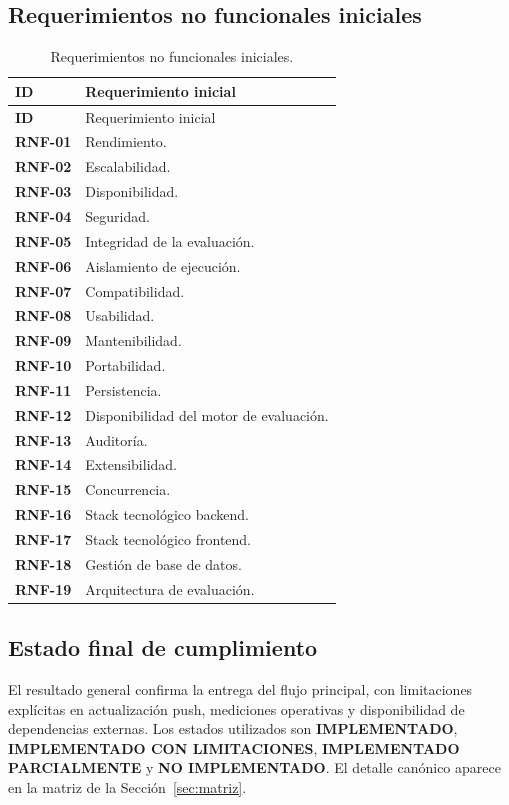 \documentclass[11pt,a4paper]{article}
\newcommand{\statusimpl}{\textbf{IMPLEMENTADO}\xspace}
\newcommand{\statuslim}{\textbf{IMPLEMENTADO CON LIMITACIONES}\xspace}
\newcommand{\statuspartial}{\textbf{IMPLEMENTADO PARCIALMENTE}\xspace}
\newcommand{\statusno}{\textbf{NO IMPLEMENTADO}\xspace}
\begin{document}
\subsection{Requerimientos no funcionales iniciales}
\begin{longtable}{>{\bfseries}p{1.6cm}p{12.6cm}}
\caption{Requerimientos no funcionales iniciales.}\label{tab:rnf-iniciales}\\
\toprule
ID & Requerimiento inicial \\
\midrule
\endfirsthead
\toprule
ID & Requerimiento inicial \\
\midrule
\endhead
RNF-01 & Rendimiento. \\
RNF-02 & Escalabilidad. \\
RNF-03 & Disponibilidad. \\
RNF-04 & Seguridad. \\
RNF-05 & Integridad de la evaluación. \\
RNF-06 & Aislamiento de ejecución. \\
RNF-07 & Compatibilidad. \\
RNF-08 & Usabilidad. \\
RNF-09 & Mantenibilidad. \\
RNF-10 & Portabilidad. \\
RNF-11 & Persistencia. \\
RNF-12 & Disponibilidad del motor de evaluación. \\
RNF-13 & Auditoría. \\
RNF-14 & Extensibilidad. \\
RNF-15 & Concurrencia. \\
RNF-16 & Stack tecnológico backend. \\
RNF-17 & Stack tecnológico frontend. \\
RNF-18 & Gestión de base de datos. \\
RNF-19 & Arquitectura de evaluación. \\
\bottomrule
\end{longtable}

\subsection{Estado final de cumplimiento}
El resultado general confirma la entrega del flujo principal, con limitaciones explícitas en actualización push, mediciones operativas y disponibilidad de dependencias externas. Los estados utilizados son \statusimpl, \statuslim, \statuspartial y \statusno. El detalle canónico aparece en la matriz de la Sección~\ref{sec:matriz}.
\end{document}
